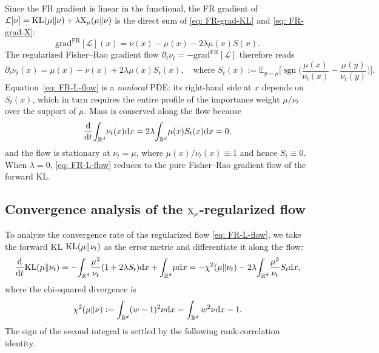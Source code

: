 \documentclass{article}
\begin{document}
Since the FR gradient is linear in the functional, the FR gradient of $\mathcal L[\nu] = \mathrm{KL}(\mu\|\nu) + \lambda \mathrm{X}_\mu(\mu\|\nu)$ is the direct sum of \eqref{eq: FR-grad-KL} and \eqref{eq: FR-grad-X}:
\begin{equation*}
    \mathrm{grad}^{\mathrm{FR}}[\mathcal L](x) = \nu(x) - \mu(x) - 2\lambda \mu(x) S(x).
\end{equation*}
The regularized Fisher--Rao gradient flow $\partial_t\nu_t = -\mathrm{grad}^{\mathrm{FR}}[\mathcal L]$ therefore reads
\begin{equation}
    \partial_t\nu_t(x) = \mu(x) - \nu(x) + 2\lambda \mu(x) S_t(x), \quad 
    \text{where~}
    S_t(x) := \mathbb E_{y\sim\mu}\biggl[\operatorname{sgn}\biggl(\frac{\mu(x)}{\nu_t(x)} - \frac{\mu(y)}{\nu_t(y)}\biggr)\biggr].
    \label{eq: FR-L-flow}
\end{equation}
Equation~\eqref{eq: FR-L-flow} is a \emph{nonlocal} PDE: its right-hand side at $x$ depends on $S_t(x)$, which in turn requires the entire profile of the importance weight $\mu/\nu_t$ over the support of $\mu$. Mass is conserved along the flow because
\begin{equation*}
    \frac{\mathrm{d}}{\mathrm{d} t}\!\int_{\mathbb R^d}\!\nu_t(x) \mathrm{d} x = 2\lambda\!\int_{\mathbb R^d}\!\mu(x) S_t(x) \mathrm{d} x = 0,
\end{equation*}
and the flow is stationary at $\nu_t = \mu$, where $\mu(x)/\nu_t(x) \equiv 1$ and hence $S_t\equiv 0$. When $\lambda = 0$, \eqref{eq: FR-L-flow} reduces to the pure Fisher--Rao gradient flow of the forward KL.

\subsection{Convergence analysis of the $\mathrm{X}_\mu$-regularized flow}
\label{subsec: FR-convergence}

To analyze the convergence rate of the regularized flow \eqref{eq: FR-L-flow}, we take the forward KL $\mathrm{KL}(\mu\|\nu_t)$ as the error metric and differentiate it along the flow:
\begin{equation*}
    \frac{\mathrm{d}}{\mathrm{d} t}\mathrm{KL}(\mu\|\nu_t) = -\!\int_{\mathbb R^d}\!\frac{\mu^2}{\nu_t}(1 + 2\lambda S_t) \mathrm{d} x + \int_{\mathbb R^d}\!\mu \mathrm{d} x = -\chi^2(\mu\|\nu_t) - 2\lambda\!\int_{\mathbb R^d}\!\frac{\mu^2}{\nu_t} S_t \mathrm{d} x,
\end{equation*}
where the chi-squared divergence is
\begin{equation*}
    \chi^2(\mu\|\nu) := \int_{\mathbb R^d}(w-1)^2\nu\mathrm{d} x = \int_{\mathbb R^d} w^2\nu\mathrm{d} x - 1.
\end{equation*}
The sign of the second integral is settled by the following rank-correlation identity.
\end{document}
